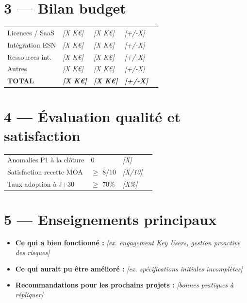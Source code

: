 \documentclass[11pt,a4paper,oneside]{report}
\begin{document}
\section*{3 — Bilan budget}

\renewcommand{\arraystretch}{1.3}
\begin{tabularx}{\textwidth}{L{5cm} C{2.5cm} C{2.5cm} C{2.5cm} Y}
\toprule
{} &  &  &  &  \\
\midrule
Licences / SaaS   & \textit{[X K€]} & \textit{[X K€]} & \textit{[+/-X]} & \\
Intégration ESN   & \textit{[X K€]} & \textit{[X K€]} & \textit{[+/-X]} & \\
Ressources int.   & \textit{[X K€]} & \textit{[X K€]} & \textit{[+/-X]} & \\
Autres            & \textit{[X K€]} & \textit{[X K€]} & \textit{[+/-X]} & \\
\midrule
{}\textbf{TOTAL} & \textbf{\textit{[X K€]}} & \textbf{\textit{[X K€]}} & \textbf{\textit{[+/-X]}} & \\
\bottomrule
\end{tabularx}

\section*{4 — Évaluation qualité et satisfaction}

\renewcommand{\arraystretch}{1.3}
\begin{tabularx}{\textwidth}{L{5cm} C{2.5cm} C{2.5cm} Y}
\toprule
{} &  &  &  \\
\midrule
Anomalies P1 à la clôture & 0 & \textit{[X]} & \\
Satisfaction recette MOA & $\geq$ 8/10 & \textit{[X/10]} & \\
Taux adoption à J+30 & $\geq$ 70\% & \textit{[X\%]} & \\
\bottomrule
\end{tabularx}

\section*{5 — Enseignements principaux}

\begin{itemize}
  \item \textbf{Ce qui a bien fonctionné :} \textit{[ex. engagement Key Users, gestion proactive des risques]}
  \item \textbf{Ce qui aurait pu être amélioré :} \textit{[ex. spécifications initiales incomplètes]}
  \item \textbf{Recommandations pour les prochains projets :} \textit{[bonnes pratiques à répliquer]}
\end{itemize}
\end{document}
